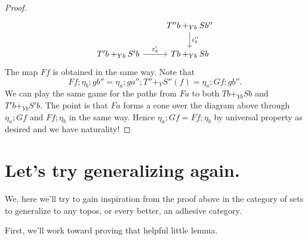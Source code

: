 \documentclass[12pt]{article}
\renewcommand{\epsilon}{\varepsilon}
\renewcommand{\(}{\left(}
\renewcommand{\)}{\right)}
\renewcommand{\{}{\left\lbrace}
\renewcommand{\}}{\right\rbrace}
\theoremstyle{remark}
\theoremstyle{definition}
\begin{document}
\begin{proof}
	\[
		\begin{tikzcd}
			{} &
			{T''b +_{Yb} Sb''} 
				\ar[d,"\epsilon''_b"] \\
			{T'b +_{Yb} S'b } 
				\ar[r, "\epsilon'_b"] &
			{Tb +_{Yb} Sb}
		\end{tikzcd}
	\]
	The map $Ff$ is obtained in the same way. Note that 
	\[
		Ff;\eta_b;gb'' 
			= \eta_a;ga'';T''+_YS''(f)
			= \eta_a;Gf;gb''.
	\]
	We can play the same game for the paths from $Fa$ to both $Tb+_{Yb}Sb$ and $T'b+_{Yb}S'b$. The point is that $Fa$ forms a cone over the diagram above through $\eta_a ;Gf$ and $Ff;\eta_b$ in the same way.  Hence $\eta_a ;Gf = Ff;\eta_b$ by universal property as desired and we have naturality!	
\end{proof}


\section*{Let's try generalizing again.}
 
 
We, here we'll try to gain inspiration from the proof above in the category of sets to generalize to any topos, or every better, an adhesive category.

First, we'll work toward proving that helpful little lemma.
\end{document}
